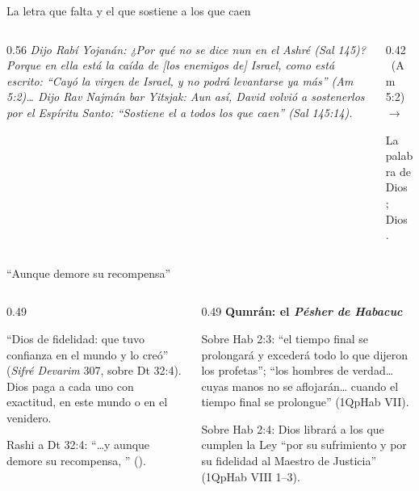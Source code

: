 \begin{frame}{La letra que falta y el que sostiene a los que caen}
\begin{columns}[t,onlytextwidth]
\begin{column}{0.56\textwidth}\scriptsize\itshape
Dijo Rabí Yojanán: ¿Por qué no se dice \emph{nun} en el \emph{Ashré} (Sal 145)? Porque en ella está la caída de [los enemigos de] Israel, como está escrito: ``Cayó la virgen de Israel, y no podrá levantarse ya más'' (Am 5:2)\ldots{} Dijo Rav Najmán bar Yitsjak: Aun así, David volvió a sostenerlos por el Espíritu Santo: ``Sostiene el \SENOR{} a todos los que caen'' (Sal 145:14).\upshape{}
\end{column}
\begin{column}{0.42\textwidth}\small
\centering{}\ (Am 5:2)\quad$\rightarrow$\quad{}\par\medskip
\raggedright La palabra de Dios ; Dios .\par\smallskip
{}
\end{column}
\end{columns}
\end{frame}

\begin{frame}{``Aunque demore su recompensa''}
\begin{columns}[t,onlytextwidth]
\begin{column}{0.49\textwidth}
\centering{}\par\smallskip
\raggedright\scriptsize ``Dios de fidelidad: que tuvo confianza en el mundo y lo creó'' (\emph{Sifré Devarim} 307, sobre Dt 32:4). Dios paga a cada uno con exactitud, en este mundo o en el venidero.\par\medskip
\small Rashi a Dt 32:4: ``\ldots{}y aunque demore su recompensa, '' ().
\end{column}
\begin{column}{0.49\textwidth}
\textbf{\small\textcolor{azul}{Qumrán: el \emph{Pésher de Habacuc}}}\par\smallskip
\scriptsize Sobre Hab 2:3: ``el tiempo final se prolongará y excederá todo lo que dijeron los profetas''; ``los hombres de verdad\ldots{} cuyas manos no se aflojarán\ldots{} cuando el tiempo final se prolongue'' (1QpHab VII).\par\smallskip
Sobre Hab 2:4: Dios librará a los que cumplen la Ley ``por su sufrimiento y por su fidelidad al Maestro de Justicia'' (1QpHab VIII 1--3).\par\smallskip
{}
\end{column}
\end{columns}
\end{frame}

